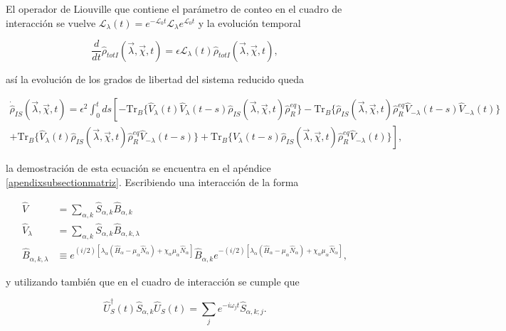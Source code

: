 El operador de Liouville que contiene el parámetro de conteo en el cuadro de interacción se vuelve $\mathcal{L}_{\lambda}(t) = e^{-\mathcal{L}_{0}t}\mathcal{L}_{\lambda}e^{\mathcal{L}_{0}t}$ y la evolución temporal

\begin{equation}
    \frac{d}{dt}\hat{\rho}_{totI}(\vec{\lambda},\vec{\chi},t) = \epsilon \mathcal{L}_{\lambda}(t)\hat{\rho}_{totI}(\vec{\lambda},\vec{\chi},t),
 \label{sec2FCS:evolution}
\end{equation}

así la evolución de los grados de libertad del sistema reducido queda 

\begin{multline}
    \dot{\hat{\rho}}_{IS}(\vec{\lambda},\vec{\chi},t) =  \epsilon^{2}\int_{0}^{t}ds \left[- \text{Tr}_{B}\{\hat{V}_{\lambda}(t)\hat{V}_{\lambda}(t-s)\hat{\rho}_{IS}(\vec{\lambda},\vec{\chi},t)\hat{\rho}^{eq}_{R} \} - \text{Tr}_{B}\{\hat{\rho}_{IS}(\vec{\lambda},\vec{\chi},t)\hat{\rho}^{eq}_{R}\hat{V}_{-\lambda}(t-s)\hat{V}_{-\lambda}(t) \} \right.\\
    \left. + \text{Tr}_{B}\{\hat{V}_{\lambda}(t)\hat{\rho}_{IS}(\vec{\lambda},\vec{\chi},t)\hat{\rho}^{eq}_{R}\hat{V}_{-\lambda}(t-s) \} + \text{Tr}_{B}\{ \hat{V}_{\lambda}(t-s)\hat{\rho}_{IS}(\vec{\lambda},\vec{\chi},t)\hat{\rho}^{eq}_{R}\hat{V}_{-\lambda}(t) \}  \right],
\label{ecmaestraVlambda}
\end{multline}

la demostración de esta ecuación se encuentra en el apéndice \ref{apendixsubsectionmatriz}. Escribiendo una interacción de la forma

\begin{align*}
    \hat{V} & = \sum_{\alpha,k}\hat{S}_{\alpha,k}\hat{B}_{\alpha,k} \\
    \hat{V}_{\lambda} & = \sum_{\alpha,k}\hat{S}_{\alpha,k}\hat{B}_{\alpha,k,\lambda} \\
    \hat{B}_{\alpha,k,\lambda} & \equiv e^{(i/2)[\lambda_{\alpha}(\hat{H}_{\alpha} - \mu_{\alpha}\hat{N}_{\alpha}) + \chi_{\alpha}\mu_{\alpha}\hat{N}_{\alpha}]}\hat{B}_{\alpha,k}e^{-(i/2)[\lambda_{\alpha}(\hat{H}_{\alpha} - \mu_{\alpha}\hat{N}_{\alpha}) + \chi_{\alpha}\mu_{\alpha}\hat{N}_{\alpha}]},  
\end{align*}

y utilizando también que en el cuadro de interacción se cumple que 

\begin{equation*}
    \hat{U}^{\dagger}_{S}(t)\hat{S}_{\alpha,k}\hat{U}_{S}(t) = \sum_{j}e^{-i\omega_{j}t}\hat{S}_{\alpha,k;j}.
\end{equation*}


